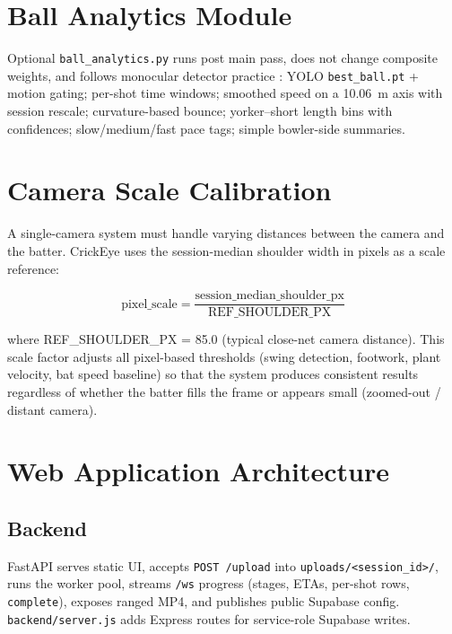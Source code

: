 \begin{justify}
\section{Ball Analytics Module}

\par Optional \texttt{ball\_analytics.py} runs post main pass, does not change composite weights, and follows monocular detector practice \cite{YOLOv8,Reno2018,Ren2009}: YOLO \texttt{best\_ball.pt} + motion gating; per-shot time windows; smoothed speed on a 10.06~m axis with session rescale; curvature-based bounce; yorker--short length bins with confidences; slow/medium/fast pace tags; simple bowler-side summaries.

\section{Camera Scale Calibration}

\par A single-camera system must handle varying distances between the camera and the batter. CrickEye uses the session-median shoulder width in pixels as a scale reference:

\begin{equation}
    \text{pixel\_scale} = \frac{\text{session\_median\_shoulder\_px}}{\text{REF\_SHOULDER\_PX}}
\end{equation}

where REF\_SHOULDER\_PX = 85.0 (typical close-net camera distance). This scale factor adjusts all pixel-based thresholds (swing detection, footwork, plant velocity, bat speed baseline) so that the system produces consistent results regardless of whether the batter fills the frame or appears small (zoomed-out / distant camera).

\section{Web Application Architecture}

\subsection{Backend}

\par FastAPI serves static UI, accepts \texttt{POST /upload} into \texttt{uploads/<session\_id>/}, runs the worker pool, streams \texttt{/ws} progress (stages, ETAs, per-shot rows, \texttt{complete}), exposes ranged MP4, and publishes public Supabase config. \texttt{backend/server.js} adds Express routes for service-role Supabase writes.


\end{justify}
